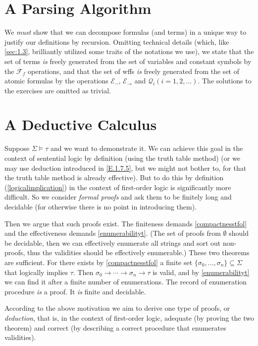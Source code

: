\section{A Parsing Algorithm}\label{sec:2.3}

We \textit{must} show that we can decompose formulas (and terms) in a unique way to justify our definitions by recursion. Omitting technical details (which, like \ref{sec:1.3}, brilliantly utilized some traits of the notations we use), we state that the set of terms \textit{is} freely generated from the set of variables and constant symbols by the $\mathcal{F}_f$ operations, and that the set of wffs \textit{is} freely generated from the set of atomic formulas by the operations $\mathcal{E}_{\neg}$, $\mathcal{E}_{\rightarrow}$ and $\mathcal{Q}_i(i=1,2,\dots).$ The solutions to the exercises are omitted as trivial.

\section{A Deductive Calculus}

Suppose $\Sigma\vDash \tau$ and we want to demonstrate it. We can achieve this goal in the context of sentential logic by definition (using the truth table method) (or we may use deduction introduced in \ref{E.1.7.5}, but we might not bother to, for that the truth table method is already effective). But to do this by definition (\ref{logicalimplication}) in the context of first-order logic is significantly more difficult. So we consider \textit{formal proofs} and ask them to be finitely long and decidable (for otherwise there is no point in introducing them).

Then we argue that such proofs exist. The finiteness demands \ref{compactnesstfol} and the effectiveness demands \ref{enumerabilityt}. (The set of proofs from $\emptyset$ should be decidable, then we can effectively enumerate all strings and sort out non-proofs, thus the validities should be effectively enumerable.) These two theorems are sufficient. For there exists by \ref{compactnesstfol} a finite set $\{\sigma_0,\dots,\sigma_n\}\subseteq \Sigma$ that logically implies $\tau$. Then $\sigma_0\rightarrow\cdots\rightarrow \sigma_n\rightarrow \tau$ is valid, and by \ref{enumerabilityt} we can find it after a finite number of enumerations. The record of enumeration procedure \textit{is} a proof. It \textit{is} finite and decidable.

According to the above motivation we aim to derive one type of proofs, or \textit{deduction}, that is, in the context of first-order logic, adequate (by proving the two theorem) and correct (by describing a correct procedure that enumerates validities).

